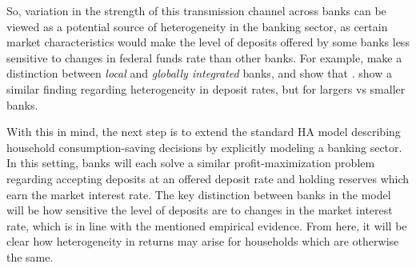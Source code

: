 \par So, variation in the strength of this transmission channel across banks can be viewed as a potential source of heterogeneity in the banking sector, as certain market characteristics would make the level of deposits offered by some banks less sensitive to changes in federal funds rate than other banks. For example, \cite{Sarkisyan2021} make a distinction between \textit{local} and \textit{globally integrated} banks, and show that . \cite{d'Avernas2024} show a similar finding regarding heterogeneity in deposit rates, but for largers vs smaller banks.

\par With this in mind, the next step is to extend the standard HA model describing household consumption-saving decisions by explicitly modeling a banking sector. In this setting, banks will each solve a similar profit-maximization problem regarding accepting deposits at an offered deposit rate and holding reserves which earn the market interest rate. The key distinction between banks in the model will be how sensitive the level of deposits are to changes in the market interest rate, which is in line with the mentioned empirical evidence. From here, it will be clear how heterogeneity in returns may arise for households which are otherwise the same.